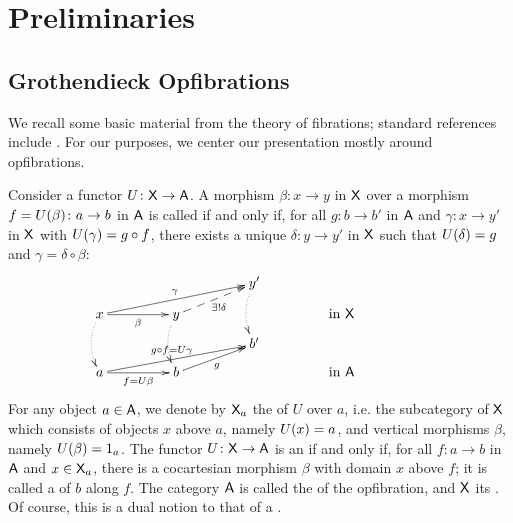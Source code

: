 \documentclass{amsart}
\begin{document}
\section{Preliminaries}\label{sec:preliminaries}

\subsection*{Grothendieck Opfibrations}
We recall some basic material from the theory of fibrations; standard references include  \cite{Grayfibredandcofibred,hermidaphd,Handbook2}. 
For our purposes, we center our presentation mostly around opfibrations.

Consider a functor $U \colon\mathsf{X} \to \mathsf{A}$. A morphism $\beta \colon x \to y$ in $\mathsf{X} $ over a morphism $f = U(\beta) \colon a \to b$ in $\mathsf{A}$ is called  if and only if, for all $g \colon b \to b'$ in $\mathsf{A}$ and $\gamma \colon x\to y'$ in $\mathsf{X} $ with $U(\gamma) = g\circ f$, there exists a unique $\delta \colon y\to y'$ in $\mathsf{X}$ such that $U(\delta) = g$ and $\gamma = \delta \circ \beta$:
\begin{equation}\label{eq:opfibration}
\xymatrix @R=.1in @C=.6in
{&& y'\ar @{.>}@/_/[dd] &&\\
x\ar[r]_-{\beta} \ar @{.>}@/_/[dd]
\ar[urr]^-{\gamma} & 
y \ar @{.>}@/_/[dd] \ar @{-->}[ur]_-{\exists! \delta}
&& \textrm{in }\X\\
&& b' &&\\
a\ar[r]_-{f=\U\beta} \ar[urr]^-{g\circ f=\U\gamma}
 & b \ar[ur]_-g && \textrm{in }\A}
\end{equation}
For any object $a\in\mathsf{A}$, we denote by $\mathsf{X}_a$ the  of $U$ over $a$, i.e. the subcategory of $\mathsf{X}$ which consists of objects $x$ above $a$, namely $U(x) = a$, and vertical morphisms $\beta$, namely $U(\beta) = 1_a$. The functor $U \colon \mathsf{X} \to \mathsf{A}$ is an  if and only if, for all $f \colon a \to b$ in $\mathsf{A}$ and $x\in\mathsf{X}_a$, there is a cocartesian morphism $\beta$ with domain $x$ above $f$; it is called a  of $b$ along $f$. The category $\mathsf{A}$ is called the  of the opfibration, and $\mathsf{X} $ its .
Of course, this is a dual notion to that of a .
\end{document}
